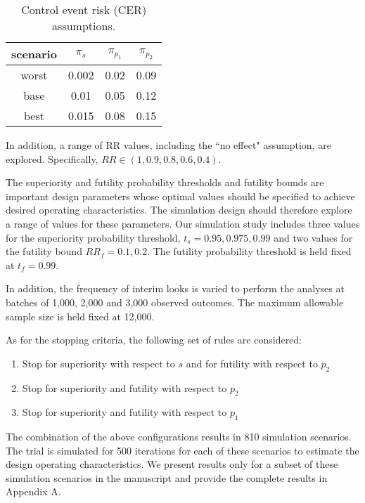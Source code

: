 \documentclass[12pt]{article}
\begin{document}
\begin{table}
	\centering
	\begin{tabular} {c| c  c  c  }
	
		\hline
		
	scenario  &$\pi_s$ &	$\pi_{p_1}$ & $\pi_{p_2}$   \\
		\hline
	worst 	&0.002 & 0.02 & 0.09 \\
	base  &0.01 & 0.05 & 0.12	\\
	best  &0.015 & 0.08 & 0.15 \\
		\hline
	\end{tabular}
	
	\caption{ Control event risk (CER) assumptions.}
	\label{t2}  
\end{table}

In addition, a range of RR values, including the ``no effect" assumption, are explored. Specifically, $RR\in (1, 0.9, 0.8, 0.6, 0.4)$. 

The superiority and futility probability thresholds and futility bounds are important design parameters whose optimal values should be specified to achieve desired operating characteristics. The simulation design should therefore explore a range of values for these parameters. Our simulation study includes three values for the superiority probability threshold, $t_s = 0.95, 0.975, 0.99$ and two values for the futility bound $RR_f = 0.1, 0.2$. The futility probability threshold is held fixed at $t_f = 0.99$.  

In addition, the frequency of interim looks is varied to perform the analyses at batches of 1,000, 2,000 and 3,000 observed outcomes. The maximum allowable sample size is held fixed at 12,000. 

As for the stopping criteria, the following set of rules are considered:
\begin{enumerate}
	\item Stop for superiority with respect to  $s$ and for futility with respect to $p_2$
	\item Stop for superiority and futility with respect to $p_2$
	\item Stop for superiority and futility with respect to $p_1$
	\end{enumerate}

The combination of the above configurations results in 810 simulation scenarios. The trial is simulated for 500 iterations for each of these scenarios to estimate the design operating characteristics. We present results only for a subset of these simulation scenarios in the manuscript and provide the complete results in Appendix A.
\end{document}
